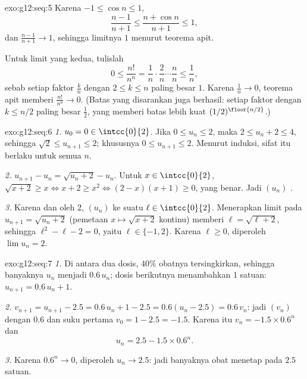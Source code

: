 \begin{solution}{exo:g12:seq:5}
Karena $-1 \leq \cos n \leq 1$,
\[
\frac{n-1}{n+1} \leq \frac{n + \cos n}{n+1} \leq 1,
\]
dan $\frac{n-1}{n+1} \to 1$, sehingga limitnya $1$ menurut teorema apit.

Untuk limit yang kedua, tulislah
\[
0 \leq \frac{n!}{n^n}
= \frac{1}{n}\cdot\frac{2}{n}\cdots\frac{n}{n}
\leq \frac{1}{n},
\]
sebab setiap faktor $\frac{k}{n}$ dengan $2 \leq k \leq n$ paling besar $1$.
Karena $\frac1n \to 0$, teorema apit memberi $\frac{n!}{n^n} \to 0$. (Batas
 yang disarankan juga berhasil: setiap faktor dengan $k \leq n/2$
paling besar $\frac12$, yang memberi batas lebih kuat $(1/2)^{\floor{n/2}}$.)
\end{solution}

\begin{solution}{exo:g12:seq:6}
\emph{1.} $u_0 = 0 \in \intcc{0}{2}$. Jika $0 \leq u_n \leq 2$, maka
$2 \leq u_n + 2 \leq 4$, sehingga $\sqrt{2} \leq u_{n+1} \leq 2$; khususnya
$0 \leq u_{n+1} \leq 2$. Menurut induksi, sifat itu berlaku untuk semua $n$.

\emph{2.} $u_{n+1} - u_n = \sqrt{u_n + 2} - u_n$. Untuk $x \in \intcc{0}{2}$,
$\sqrt{x+2} \geq x \iff x + 2 \geq x^2 \iff (2-x)(x+1) \geq 0$, yang benar.
Jadi $(u_n)$ .

\emph{3.} Karena  dan  oleh $2$, $(u_n)$  ke suatu
$\ell \in \intcc{0}{2}$. Menerapkan limit pada $u_{n+1} = \sqrt{u_n + 2}$
(pemetaan $x \mapsto \sqrt{x+2}$ kontinu) memberi $\ell = \sqrt{\ell + 2}$,
sehingga $\ell^2 - \ell - 2 = 0$, yaitu $\ell \in \{-1, 2\}$. Karena
$\ell \geq 0$, diperoleh $\lim u_n = 2$.
\end{solution}

\begin{solution}{exo:g12:seq:7}
\emph{1.} Di antara dua dosis, $40\%$ obatnya tersingkirkan, sehingga
banyaknya $u_n$ menjadi $0.6\,u_n$; dosis berikutnya menambahkan $1$ satuan:
$u_{n+1} = 0.6\,u_n + 1$.

\emph{2.} $v_{n+1} = u_{n+1} - 2.5 = 0.6\,u_n + 1 - 2.5 = 0.6(u_n - 2.5)
= 0.6\,v_n$: jadi $(v_n)$  dengan  $0.6$ dan suku pertama
$v_0 = 1 - 2.5 = -1.5$. Karena itu $v_n = -1.5 \times 0.6^n$ dan
\[
u_n = 2.5 - 1.5 \times 0.6^n .
\]

\emph{3.} Karena $0.6^n \to 0$, diperoleh $u_n \to 2.5$: jadi banyaknya obat
menetap pada $2.5$ satuan.
\end{solution}

